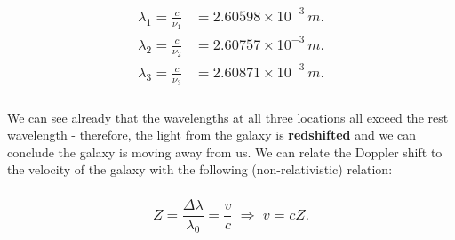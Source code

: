 \documentclass[
]{article}
\begin{document}
\hypertarget{beginmatrix-lambda_1-fraccnu_1-2.60598-times-10--3-m.-lambda_2-fraccnu_2-2.60757-times-10--3-m.-lambda_3-fraccnu_3-2.60871-times-10--3-m.-endmatrix}{%
\subsubsection{\texorpdfstring{{\[\begin{matrix}
{\lambda_{1} = \frac{c}{\nu_{1}}} & {= 2.60598 \times 10^{- 3}\, m.} \\
{\lambda_{2} = \frac{c}{\nu_{2}}} & {= 2.60757 \times 10^{- 3}\, m.} \\
{\lambda_{3} = \frac{c}{\nu_{3}}} & {= 2.60871 \times 10^{- 3}\, m.} \\
\end{matrix}\]}}{\textbackslash begin\{matrix\}
\{\textbackslash lambda\_\{1\} = \textbackslash frac\{c\}\{\textbackslash nu\_\{1\}\}\} \& \{= 2.60598 \textbackslash times 10\^{}\{- 3\}\textbackslash, m.\} \textbackslash\textbackslash{}
\{\textbackslash lambda\_\{2\} = \textbackslash frac\{c\}\{\textbackslash nu\_\{2\}\}\} \& \{= 2.60757 \textbackslash times 10\^{}\{- 3\}\textbackslash, m.\} \textbackslash\textbackslash{}
\{\textbackslash lambda\_\{3\} = \textbackslash frac\{c\}\{\textbackslash nu\_\{3\}\}\} \& \{= 2.60871 \textbackslash times 10\^{}\{- 3\}\textbackslash, m.\} \textbackslash\textbackslash{}
\textbackslash end\{matrix\}}}\label{beginmatrix-lambda_1-fraccnu_1-2.60598-times-10--3-m.-lambda_2-fraccnu_2-2.60757-times-10--3-m.-lambda_3-fraccnu_3-2.60871-times-10--3-m.-endmatrix}}

We can see already that the wavelengths at all three locations all
exceed the rest wavelength - therefore, the light from the galaxy is
\textbf{redshifted} and we can conclude the galaxy is moving away from
us. We can relate the Doppler shift to the velocity of the galaxy with
the following (non-relativistic) relation:

\hypertarget{z-fracdeltalambdalambda_0-fracvclongrightarrow-v-cz.}{%
\subsubsection{\texorpdfstring{{\[Z = \frac{\Delta\lambda}{\lambda_{0}} = \frac{v}{c}\;\Longrightarrow\; v = cZ.\]}}{Z = \textbackslash frac\{\textbackslash Delta\textbackslash lambda\}\{\textbackslash lambda\_\{0\}\} = \textbackslash frac\{v\}\{c\}\textbackslash;\textbackslash Longrightarrow\textbackslash; v = cZ.}}\label{z-fracdeltalambdalambda_0-fracvclongrightarrow-v-cz.}}
\end{document}
